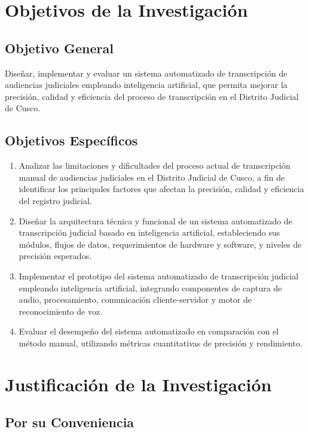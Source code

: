 \documentclass[12pt,a4paper,oneside]{report}
\begin{document}
\section{Objetivos de la Investigación}

\subsection{Objetivo General}

Diseñar, implementar y evaluar un sistema automatizado de transcripción de audiencias judiciales empleando inteligencia artificial, que permita mejorar la precisión, calidad y eficiencia del proceso de transcripción en el Distrito Judicial de Cusco.

\subsection{Objetivos Específicos}

\begin{enumerate}[label=\alph*)]
  \item Analizar las limitaciones y dificultades del proceso actual de transcripción manual de audiencias judiciales en el Distrito Judicial de Cusco, a fin de identificar los principales factores que afectan la precisión, calidad y eficiencia del registro judicial.
  \item Diseñar la arquitectura técnica y funcional de un sistema automatizado de transcripción judicial basado en inteligencia artificial, estableciendo sus módulos, flujos de datos, requerimientos de hardware y software, y niveles de precisión esperados.
  \item Implementar el prototipo del sistema automatizado de transcripción judicial empleando inteligencia artificial, integrando componentes de captura de audio, procesamiento, comunicación cliente-servidor y motor de reconocimiento de voz.
  \item Evaluar el desempeño del sistema automatizado en comparación con el método manual, utilizando métricas cuantitativas de precisión y rendimiento.
\end{enumerate}

\section{Justificación de la Investigación}

\subsection{Por su Conveniencia}
\end{document}
